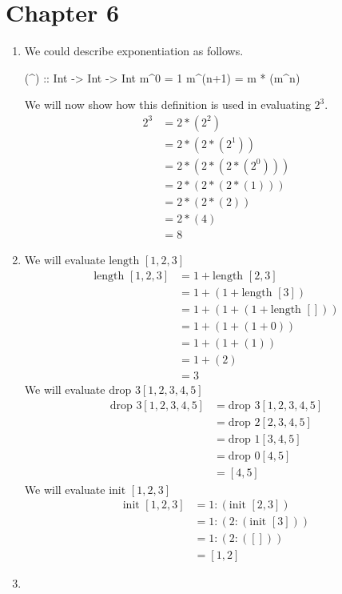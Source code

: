 \documentclass{article}
\begin{document}
\section{Chapter 6}
\begin{enumerate}
\item We could describe exponentiation as follows.
\begin{code}
(^) :: Int -> Int -> Int
m^0 = 1
m^(n+1) = m * (m^n)
\end{code}
We will now show how this definition is used in evaluating $2^3$.
\begin{align*}
2^3 &= 2 * ( 2^2)\\
&= 2 * ( 2 * (2^1))\\
&= 2 * (2 * ( 2 * ( 2^0)))\\
&= 2 * (2 * ( 2 * ( 1)))\\
&=2 * (2 * ( 2 ))\\
&= 2 * (4)\\
&= 8
\end{align*}

\item We will evaluate $\text{length }[1,2,3]$
\begin{align*}
\text{length } [1,2,3] &= 1 + \text{length } [2,3]\\
&= 1 + (1 + \text{length } [3])\\
&= 1  +(1 + (1 + \text{length } []))\\
&= 1 + (1+(1+0))\\
&= 1 + (1 + (1))\\
&= 1 + (2)\\
&=3
\end{align*}
We will evaluate $\text{drop }3 [1,2,3,4,5]$
\begin{align*}
\text{drop }3 [1,2,3,4,5] &= \text{drop }3 [1,2,3,4,5]\\
&= \text{drop }2 [2,3,4,5]\\
&= \text{drop }1 [3,4,5]\\
&= \text{drop }0 [4,5]\\
&= [4,5]
\end{align*}
We will evaluate $\text{init } [1,2,3]$
\begin{align*}
\text{init } [1,2,3] &= 1:(\text{init } [2,3])\\
&= 1 : ( 2 : (\text{init } [3] ))\\
&= 1 : ( 2: ([]))\\
&= [1,2]
\end{align*}

\item 


\end{enumerate}
\end{document}
